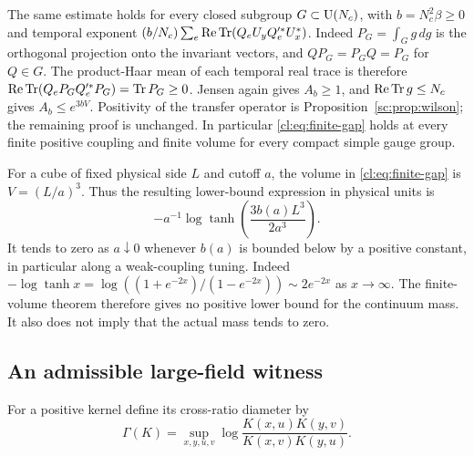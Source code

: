 The same estimate holds for every closed subgroup $G\subset\mathrm{U}(N_c)$,
with $b=N_c^2\beta\ge0$ and temporal exponent
$(b/N_c)\sum_e\operatorname{Re}\operatorname{Tr}(Q_eU_yQ_e'^*U_x^*)$.
Indeed $P_G=\int_Gg\,dg$ is the orthogonal projection onto the invariant
vectors, and $QP_G=P_GQ=P_G$ for $Q\in G$. The product-Haar mean of
each temporal real trace is therefore
$\operatorname{Re}\operatorname{Tr}(Q_eP_GQ_e'^*P_G)=\operatorname{Tr}P_G\ge0$.
Jensen again gives $A_b\ge1$, and $\operatorname{Re}\operatorname{Tr} g\le N_c$ gives
$A_b\le e^{3bV}$. Positivity of the transfer operator is
Proposition~\ref{sc:prop:wilson}; the remaining proof is unchanged.
In particular \eqref{cl:eq:finite-gap} holds at every finite positive
coupling and finite volume for every compact simple gauge group.

For a cube of fixed physical side $L$ and cutoff $a$, the volume in
\eqref{cl:eq:finite-gap} is $V=(L/a)^3$. Thus the resulting lower-bound
expression in physical units is
\[
-a^{-1}\log\tanh\!\left(\frac{3b(a)L^3}{2a^3}\right).
\]
It tends to zero as $a\downarrow0$ whenever $b(a)$ is bounded below by a
positive constant, in particular along a weak-coupling tuning. Indeed
$-\log\tanh x=\log((1+e^{-2x})/(1-e^{-2x}))\sim2e^{-2x}$ as
$x\to\infty$. The finite-volume theorem therefore gives no positive
lower bound for the continuum mass. It also does not imply that the
actual mass tends to zero.

\subsection{An admissible large-field witness}
For a positive kernel define its cross-ratio diameter by
\[
\Gamma(K)=\sup_{x,y,u,v}\log
                   \frac{K(x,u)K(y,v)}{K(x,v)K(y,u)}.
\]

